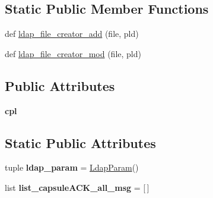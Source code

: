 \subsection*{Static Public Member Functions}
\begin{DoxyCompactItemize}
\item 
def \hyperlink{classorg_1_1swallow__labs_1_1model_1_1_capsule_processor_1_1_capsule_processor_ae1fef1f6a757e2ae9830b66180bc0c92}{ldap\+\_\+file\+\_\+creator\+\_\+add} (file, pld)
\item 
def \hyperlink{classorg_1_1swallow__labs_1_1model_1_1_capsule_processor_1_1_capsule_processor_a82f41c0cafb92e889f820e44ef90ea12}{ldap\+\_\+file\+\_\+creator\+\_\+mod} (file, pld)
\end{DoxyCompactItemize}
\subsection*{Public Attributes}
\begin{DoxyCompactItemize}
\item 
\hypertarget{classorg_1_1swallow__labs_1_1model_1_1_capsule_processor_1_1_capsule_processor_a3e50eeedb4af8e8b92317a258f6acb8c}{}{\bfseries cpl}\label{classorg_1_1swallow__labs_1_1model_1_1_capsule_processor_1_1_capsule_processor_a3e50eeedb4af8e8b92317a258f6acb8c}

\end{DoxyCompactItemize}
\subsection*{Static Public Attributes}
\begin{DoxyCompactItemize}
\item 
\hypertarget{classorg_1_1swallow__labs_1_1model_1_1_capsule_processor_1_1_capsule_processor_ac2867f41749903c2041d705713b10efd}{}tuple {\bfseries ldap\+\_\+param} = \hyperlink{classorg_1_1swallow__labs_1_1model_1_1_ldap_param_1_1_ldap_param}{Ldap\+Param}()\label{classorg_1_1swallow__labs_1_1model_1_1_capsule_processor_1_1_capsule_processor_ac2867f41749903c2041d705713b10efd}

\item 
\hypertarget{classorg_1_1swallow__labs_1_1model_1_1_capsule_processor_1_1_capsule_processor_a5542cdd5be2ac30e0e8755d4bf0e105d}{}list {\bfseries list\+\_\+capsule\+A\+C\+K\+\_\+all\+\_\+msg} = \mbox{[}$\,$\mbox{]}\label{classorg_1_1swallow__labs_1_1model_1_1_capsule_processor_1_1_capsule_processor_a5542cdd5be2ac30e0e8755d4bf0e105d}

\end{DoxyCompactItemize}


